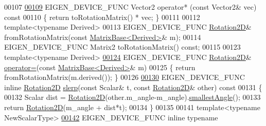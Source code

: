 \begin{DoxyCode}
00107 
\hyperlink{group___geometry___module_a6650136f5839cfd028fd7f1373d06882}{00109}   EIGEN\_DEVICE\_FUNC Vector2 operator* (\textcolor{keyword}{const} Vector2& vec)\textcolor{keyword}{ const}
00110 \textcolor{keyword}{  }\{ \textcolor{keywordflow}{return} toRotationMatrix() * vec; \}
00111   
00112   \textcolor{keyword}{template}<\textcolor{keyword}{typename} Derived>
00113   EIGEN\_DEVICE\_FUNC \hyperlink{group___geometry___module_class_eigen_1_1_rotation2_d}{Rotation2D}& fromRotationMatrix(\textcolor{keyword}{const} 
      \hyperlink{group___core___module_class_eigen_1_1_matrix_base}{MatrixBase<Derived>}& m);
00114   EIGEN\_DEVICE\_FUNC Matrix2 toRotationMatrix() \textcolor{keyword}{const};
00115 
00123   \textcolor{keyword}{template}<\textcolor{keyword}{typename} Derived>
\hyperlink{group___geometry___module_a483efa61d85a46bb94912a68cfee9902}{00124}   EIGEN\_DEVICE\_FUNC \hyperlink{group___geometry___module_class_eigen_1_1_rotation2_d}{Rotation2D}& \hyperlink{group___geometry___module_a483efa61d85a46bb94912a68cfee9902}{operator=}(\textcolor{keyword}{const}  
      \hyperlink{group___core___module_class_eigen_1_1_matrix_base}{MatrixBase<Derived>}& m)
00125   \{ \textcolor{keywordflow}{return} fromRotationMatrix(m.derived()); \}
00126 
\hyperlink{group___geometry___module_a47058d6327b801f6987506dcfbffb77f}{00130}   EIGEN\_DEVICE\_FUNC \textcolor{keyword}{inline} \hyperlink{group___geometry___module_class_eigen_1_1_rotation2_d}{Rotation2D} \hyperlink{group___geometry___module_a47058d6327b801f6987506dcfbffb77f}{slerp}(\textcolor{keyword}{const} Scalar& t, \textcolor{keyword}{const} 
      \hyperlink{group___geometry___module_class_eigen_1_1_rotation2_d}{Rotation2D}& other)\textcolor{keyword}{ const}
00131 \textcolor{keyword}{  }\{
00132     Scalar dist = \hyperlink{group___geometry___module_class_eigen_1_1_rotation2_d}{Rotation2D}(other.m\_angle-m\_angle).\hyperlink{group___geometry___module_a38e64a85197dc268a3e7832e75e469c7}{smallestAngle}();
00133     \textcolor{keywordflow}{return} \hyperlink{group___geometry___module_class_eigen_1_1_rotation2_d}{Rotation2D}(m\_angle + dist*t);
00134   \}
00135 
00141   \textcolor{keyword}{template}<\textcolor{keyword}{typename} NewScalarType>
\hyperlink{group___geometry___module_a7a2057f37733b0d153f542fffe8207cf}{00142}   EIGEN\_DEVICE\_FUNC \textcolor{keyword}{inline} \textcolor{keyword}{typename} 

\end{DoxyCode}
